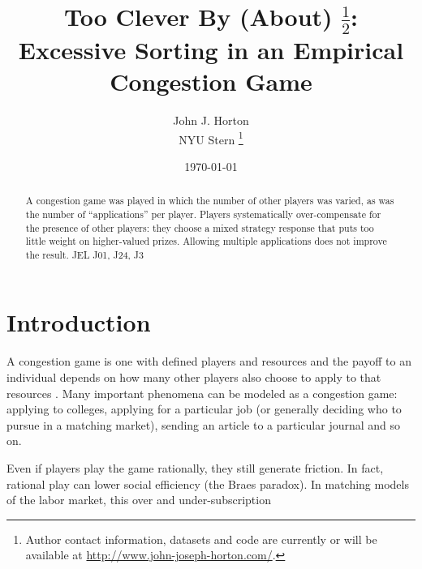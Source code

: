 \documentclass[11pt]{article}
\begin{document}
 

\title{Too Clever By (About) $\frac{1}{2}$: \\ 
Excessive Sorting in an Empirical Congestion Game} 

\date{\today}

\author{ John J. Horton \\ NYU Stern \footnote{ Author contact information, datasets and code are currently or will be available at \href{http://www.john-joseph-horton.com/}{http://www.john-joseph-horton.com/}. } }
\maketitle

\begin{abstract}
\noindent  A congestion game was played in which the number of other players was varied, as was the number of ``applications'' per player. 
Players systematically over-compensate for the presence of other players: 
they choose a mixed strategy response that puts too little weight on higher-valued prizes.
Allowing multiple applications does not improve the result.  
\newline 
\newline 
\noindent JEL J01, J24, J3
\end{abstract} 

\section{Introduction}


A congestion game is one with defined players and resources and the payoff to an individual depends on how many other players also choose to apply to that resources \citep{monderer1996potential}. 
Many important phenomena can be modeled as a congestion game: applying to colleges, applying for a particular job (or generally deciding who to pursue in a matching market), sending an article to a particular journal and so on. 


Even if players play the game rationally, they still generate friction. 
In fact, rational play can lower social efficiency (the Braes paradox). 
In matching models of the labor market, this over and
under-subscription 

\cite{milchtaich1996congestion} 
\cite{chien2011convergence} 
\end{document}
